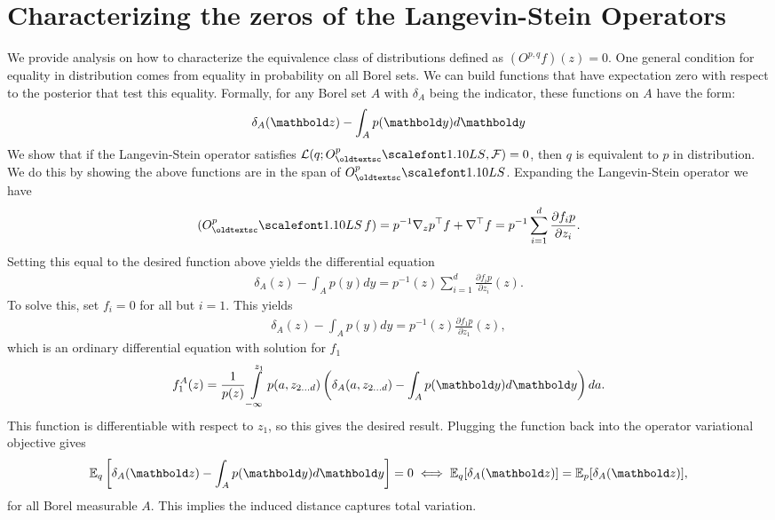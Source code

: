\section{Characterizing the zeros of the Langevin-Stein Operators}
\label{sec:optimal_operator}
We provide analysis on how to characterize the equivalence class of
distributions defined as $(O^{p,q}f)(z) = 0$. One general condition for
equality in distribution comes from equality in probability on all Borel sets.
We can build functions that have expectation zero with respect to the posterior
that test this equality.
Formally, for any Borel set $A$ with $\delta_A$ being the indicator, these functions on $A$ have the form:
\begin{align*}
\delta_{A}(\mbz) - \int_A p(\mby) d\mby
\end{align*}
We show that if the Langevin-Stein operator
satisfies $\cL(q ; O^{p}_\textsc{LS}, \cF) = 0$, then $q$ is equivalent to $p$
in distribution. We do this by showing the above functions are in the span of $O^{p}_\textsc{LS}$.
Expanding the Langevin-Stein operator we have
\begin{align*}
(O^{p}_\textsc{LS}  \, f)  =  p^{-1} \nabla_z p^\top f + \nabla^\top f
= p^{-1} \sum_{i=1}^d  \frac{\partial{f_i p}}{{\partial z_i}}.
\end{align*}
Setting this equal to the desired function above yields the differential equation
\begin{align*}
\delta_{A}(z) -  \int_A p(y) dy
= p^{-1}(z) \sum_{i=1}^d  \frac{\partial{f_i p}}{{\partial z_i}}(z).
\end{align*}
To solve this, set $f_i = 0$ for all but $i=1$. This yields
\begin{align*}
\delta_{A}(z) -  \int_A p(y) dy
= p^{-1}(z) \frac{\partial{f_1 p}}{{\partial z_1}}(z),
\end{align*}
which is an ordinary differential equation with solution for $f_1$
\begin{align*}
f_1^A(z) = \frac{1}{p(z)} \int\limits_{-\infty}^{z_1} p(a, z_{2...d}) \left(\delta_{A}(a, z_{2...d}) -  \int_A p(\mby) d\mby \right) da.
\end{align*}
This function is differentiable with respect to $z_1$, so this gives the desired result. Plugging the function back into the operator variational objective gives
\begin{align*}
\E_q\left[\delta_{A}(\mbz) -  \int_A p(\mby) d\mby\right] = 0 \iff \E_q[\delta_{A}(\mbz)] = \E_p[\delta_{A}(\mbz)],
\end{align*}
for all Borel measurable $A$. This implies the induced distance captures total variation.


